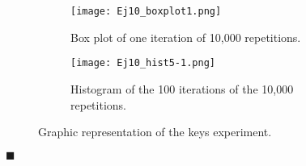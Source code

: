 \documentclass{article}
\begin{document}
\begin{figure}[]
\begin{subfigure}{.5\textwidth}
  \centering
  \texttt{[image: Ej10\_boxplot1.png]}  
  \caption{Box plot of one iteration of 10,000 repetitions. }
  \label{sb5-1}
\end{subfigure}\hspace{5mm}%
\begin{subfigure}{.5\textwidth}
  \centering
  \texttt{[image: Ej10\_hist5-1.png]}  
  \caption{Histogram of the 100 iterations of the 10,000 repetitions.}
  \label{sb5-2}
\end{subfigure}
	\caption{Graphic representation of the keys experiment. }
\label{fig5}
\end{figure}

\begin{flushright}
$\blacksquare$
\end{flushright}





 
\end{document}
